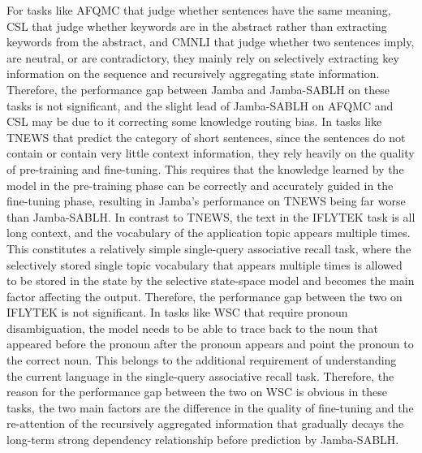 \documentclass{article}
\theoremstyle{plain}
\theoremstyle{definition}
\theoremstyle{remark}
\begin{document}
For tasks like AFQMC that judge whether sentences have the same meaning, CSL that judge whether keywords are in the abstract rather than extracting keywords from the abstract, and CMNLI that judge whether two sentences imply, are neutral, or are contradictory, they mainly rely on selectively extracting key information on the sequence and recursively aggregating state information. Therefore, the performance gap between Jamba and Jamba-SABLH on these tasks is not significant, and the slight lead of Jamba-SABLH on AFQMC and CSL may be due to it correcting some knowledge routing bias. In tasks like TNEWS that predict the category of short sentences, since the sentences do not contain or contain very little context information, they rely heavily on the quality of pre-training and fine-tuning. This requires that the knowledge learned by the model in the pre-training phase can be correctly and accurately guided in the fine-tuning phase, resulting in Jamba's performance on TNEWS being far worse than Jamba-SABLH. In contrast to TNEWS, the text in the IFLYTEK task is all long context, and the vocabulary of the application topic appears multiple times. This constitutes a relatively simple single-query associative recall task, where the selectively stored single topic vocabulary that appears multiple times is allowed to be stored in the state by the selective state-space model and becomes the main factor affecting the output. Therefore, the performance gap between the two on IFLYTEK is not significant. In tasks like WSC that require pronoun disambiguation, the model needs to be able to trace back to the noun that appeared before the pronoun after the pronoun appears and point the pronoun to the correct noun. This belongs to the additional requirement of understanding the current language in the single-query associative recall task. Therefore, the reason for the performance gap between the two on WSC is obvious in these tasks, the two main factors are the difference in the quality of fine-tuning and the re-attention of the recursively aggregated information that gradually decays the long-term strong dependency relationship before prediction by Jamba-SABLH.
\end{document}
